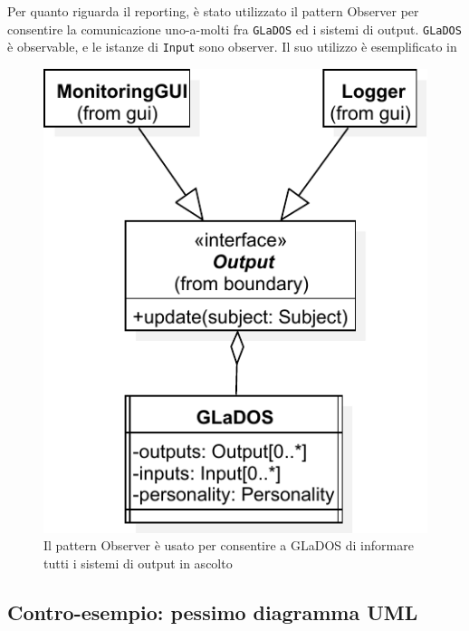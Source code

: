 \documentclass[a4paper,12pt]{report}
\begin{document}
Per quanto riguarda il reporting, è stato utilizzato il pattern Observer per consentire la 
comunicazione uno-a-molti fra \texttt{GLaDOS} ed i sistemi di output.
%
\texttt{GLaDOS} è observable, e le istanze di \texttt{Input} sono observer.
%
Il suo utilizzo è esemplificato in 

\begin{figure}[H]
\centering{}
\includegraphics[width=\textwidth]{img/observer}
\caption{Il pattern Observer è usato per consentire a GLaDOS di informare tutti i sistemi di output in ascolto}
\label{img:observer}
\end{figure}

\subsection*{Contro-esempio: pessimo diagramma UML}
\end{document}
